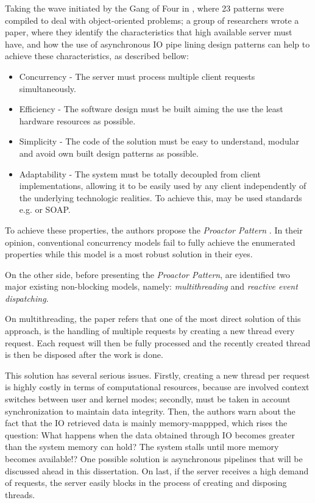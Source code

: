 Taking the wave initiated by the Gang of Four in \citep{gof}, where 23 patterns were compiled to deal with object-oriented problems; a group of researchers wrote a paper, where they identify the characteristics that high available server must have, and how the use of asynchronous IO pipe lining design patterns can help to achieve these characteristics, as described bellow:
\begin{itemize}
	\item Concurrency - The server must process multiple client requests simultaneously.\\
	\item Efficiency - The software design must be built aiming the use the least hardware resources as possible. \\
	\item Simplicity - The code of the solution must be easy to understand, modular and avoid own built design patterns as possible. \\
    \item Adaptability - The system must be totally decoupled from client implementations, allowing it to be easily used by any client independently of the underlying technologic realities. To achieve this, may be used standards e.g. \cite{REST} or SOAP.\\
\end{itemize}

To achieve these properties, the authors propose the \textit{Proactor Pattern} \citep{proactor}. In their opinion, conventional concurrency models fail to fully achieve the enumerated properties while this model is a most robust solution in their eyes.

On the other side, before presenting the \textit{Proactor Pattern}, are identified two major existing non-blocking models, namely: \textit{multithreading} and \textit{reactive event dispatching}. 

On multithreading, the paper refers that one of the most direct solution of this approach, is the handling of multiple requests by creating a new thread every request. Each request will then be fully processed and the recently created thread is then be disposed after the work is done. 

This solution has several serious issues. Firstly, creating a new thread per request is highly costly in terms of computational resources,
because are involved context switches between user and kernel modes; secondly, must be taken in account synchronization to maintain data integrity.
Then, the authors warn about the fact that the IO retrieved data is mainly memory-mappped, which rises the question: What happens when the data obtained through IO becomes greater than the system memory can hold? The system stalls until more memory becomes available!? One possible solution is asynchronous pipelines that will be discussed ahead in this dissertation.
On last, if the server receives a high demand of requests, the server easily blocks in the process of creating and disposing threads. 

